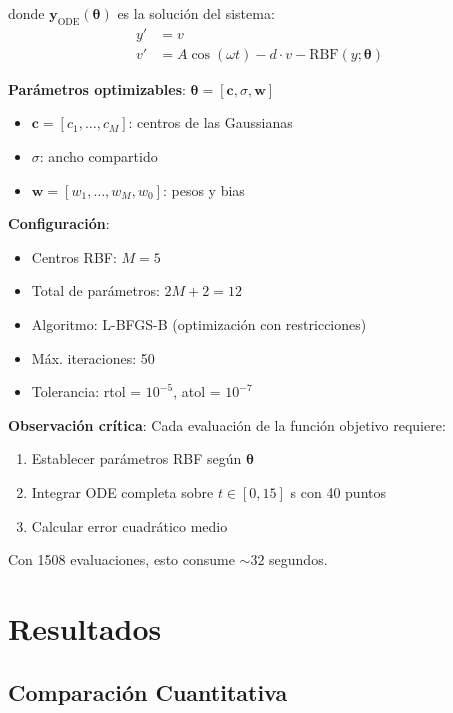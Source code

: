 \documentclass[11pt,a4paper]{article}
\begin{document}
donde $\mathbf{y}_{\text{ODE}}(\boldsymbol{\theta})$ es la solución del sistema:
\begin{align}
y' &= v \\
v' &= A \cos(\omega t) - d \cdot v - \text{RBF}(y; \boldsymbol{\theta})
\end{align}

\textbf{Parámetros optimizables}: $\boldsymbol{\theta} = [\mathbf{c}, \sigma, \mathbf{w}]$
\begin{itemize}
\item $\mathbf{c} = [c_1, \ldots, c_M]$: centros de las Gaussianas
\item $\sigma$: ancho compartido
\item $\mathbf{w} = [w_1, \ldots, w_M, w_0]$: pesos y bias
\end{itemize}

\textbf{Configuración}:
\begin{itemize}
\item Centros RBF: $M = 5$
\item Total de parámetros: $2M + 2 = 12$
\item Algoritmo: L-BFGS-B (optimización con restricciones)
\item Máx. iteraciones: 50
\item Tolerancia: rtol = $10^{-5}$, atol = $10^{-7}$
\end{itemize}

\textbf{Observación crítica}: Cada evaluación de la función objetivo requiere:
\begin{enumerate}
\item Establecer parámetros RBF según $\boldsymbol{\theta}$
\item Integrar ODE completa sobre $t \in [0, 15]$ s con 40 puntos
\item Calcular error cuadrático medio
\end{enumerate}

Con 1508 evaluaciones, esto consume $\sim 32$ segundos.

\section{Resultados}

\subsection{Comparación Cuantitativa}
\end{document}
